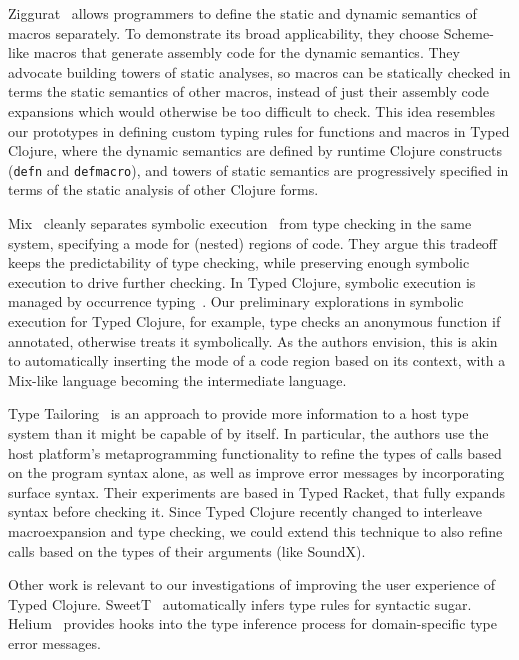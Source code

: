 \documentclass[9pt]{extarticle}
\begin{document}
Ziggurat~\cite{Fisher06staticanalysis} allows programmers to define
the static and dynamic semantics of macros separately. To demonstrate its
broad applicability, they choose Scheme-like macros that generate assembly code
for the dynamic semantics.
They advocate building towers of static analyses, so
macros can be statically checked in terms the static semantics of other macros, instead
of just their assembly code expansions which would otherwise be too difficult to check.
This idea resembles our prototypes in defining custom typing rules for functions and macros in Typed Clojure,
where the dynamic semantics are defined by runtime Clojure constructs (\texttt{defn}
and \texttt{defmacro}), and towers of static semantics are progressively specified in terms of the static
analysis of other Clojure forms.

Mix~\cite{Khoo2010MTC} cleanly separates symbolic execution~\cite{King1976SEP} from type checking
in the same system, specifying a mode for (nested) regions of code.
They argue this tradeoff keeps the predictability of type checking, while preserving enough
symbolic execution to drive further checking.
In Typed Clojure, symbolic execution is managed by occurrence typing~\cite{TF10}.
Our preliminary explorations in symbolic execution for Typed Clojure, for example, type checks an
anonymous function if annotated, otherwise treats it symbolically.
As the authors envision, this is akin to automatically inserting
the mode of a code region based on its context, with a Mix-like language
becoming the intermediate language.

Type Tailoring~\cite{greenmanttailoring} is an approach to provide more information
to a host type system than it might be capable of by itself.
In particular, the authors use the host platform's metaprogramming functionality
to refine the types of calls based on the program syntax alone, as well as improve
error messages by incorporating surface syntax. Their experiments are based in Typed Racket, that fully expands
syntax before checking it. Since Typed Clojure recently changed to interleave macroexpansion
and type checking, we could extend this technique to also refine calls based on the
types of their arguments (like SoundX).


Other work is relevant to our investigations of improving the user experience
of Typed Clojure. SweetT~\cite{pombrio2018inferring} automatically infers type rules
for syntactic sugar. Helium~\cite{Heeren2003STI} provides hooks into the type inference
process for domain-specific type error messages.
\end{document}
